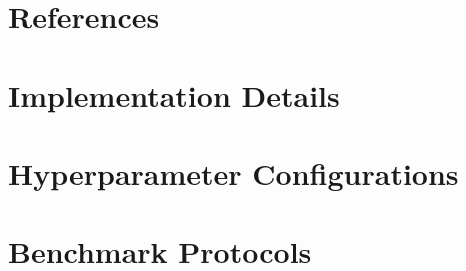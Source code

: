 \documentclass[conference]{IEEEtran}
\begin{document}


\section*{References}



\appendix
\section{Implementation Details}


\section{Hyperparameter Configurations}


\section{Benchmark Protocols}

\end{document}
